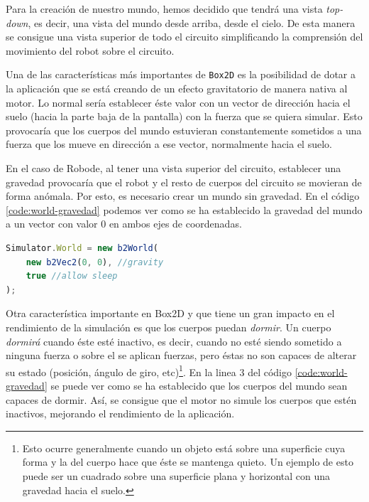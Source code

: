{Para la creación de nuestro mundo, hemos decidido que tendrá una vista \emph{top-down}, es decir, una vista del mundo desde arriba, desde el cielo. De esta manera se consigue una vista superior de todo el circuito simplificando la comprensión del movimiento del robot sobre el circuito.

Una de las características más importantes de \texttt{Box2D} es la posibilidad de dotar a la aplicación que se está creando de un efecto gravitatorio de manera nativa al motor. Lo normal sería establecer éste valor con un vector de dirección hacia el suelo (hacia la parte baja de la pantalla) con la fuerza que se quiera simular. Esto provocaría que los cuerpos del mundo estuvieran constantemente sometidos a una fuerza que los mueve en dirección a ese vector, normalmente hacia el suelo.  

En el caso de Robode, al tener una vista superior del circuito, establecer una gravedad provocaría que el robot y el resto de cuerpos del circuito se movieran de forma anómala. Por esto, es necesario crear un mundo sin gravedad. En el código \ref{code:world-gravedad} podemos ver como se ha establecido la gravedad del mundo a un vector con valor 0 en ambos ejes de coordenadas. 

\begin{lstlisting}[language={Javascript},label={code:world-gravedad}, caption={Definición del objeto \texttt{World} en Box2D con gravedad 0 y permitiendo que los cuerpos sean capaces de dormir.}]
Simulator.World = new b2World(
	new b2Vec2(0, 0), //gravity
	true //allow sleep
);
\end{lstlisting}

Otra característica importante en Box2D y que tiene un gran impacto en el rendimiento de la simulación es que los cuerpos puedan \emph{dormir}. Un cuerpo \emph{dormirá} cuando éste esté inactivo, es decir, cuando no esté siendo sometido a ninguna fuerza o sobre el se aplican fuerzas, pero éstas no son capaces de alterar su estado (posición, ángulo de giro, etc)\footnote{Esto ocurre generalmente cuando un objeto está sobre una superficie cuya forma y la del cuerpo hace que éste se mantenga quieto. Un ejemplo de esto puede ser un cuadrado sobre una superficie plana y horizontal con una gravedad hacia el suelo.}. En la linea 3 del código \ref{code:world-gravedad} se puede ver como se ha establecido que los cuerpos del mundo sean capaces de dormir. Así, se consigue que el motor no simule los cuerpos que estén inactivos, mejorando el rendimiento de la aplicación.

}
